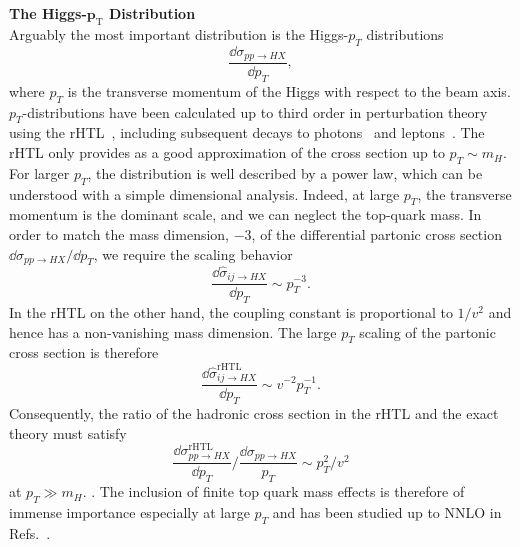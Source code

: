 \textbf{The Higgs-$\mathbf{p}_\mathrm{T}$ Distribution}\\
Arguably the most important distribution is the Higgs-$p_T$ distributions
\begin{equation}
\frac{\dd \sigma_{pp \rightarrow HX}}{\dd  p_T},
\end{equation}
where $p_T$ is the transverse momentum of the Higgs with respect to the beam axis. $p_T$-distributions have been calculated up to third order in perturbation theory using the \acs{rHTL}~\cite{Chen:2014gva,Becker:2020rjp}, including subsequent decays to photons~\cite{Chen:2021isd} and leptons~\cite{Chen:2019zel}. The \acs{rHTL} only provides as a good approximation of the cross section up to $p_T \sim m_H$. For larger $p_T$, the distribution is well described by a power law, which can be understood with a simple dimensional analysis. Indeed, at large $p_T$, the transverse momentum is the dominant scale, and we can neglect the top-quark mass. In order to match the mass dimension, $-3$, of the differential partonic cross section $\dd \sigma_{pp \rightarrow HX}/\dd p_T$, we require the scaling behavior
\begin{equation}
\frac{\dd \hat{\sigma}_{ij \rightarrow HX}}{\dd p_T} \sim  p_T^{-3}.
\end{equation}
In the \acs{rHTL} on the other hand, the coupling constant is proportional to $1/v^2$ and hence has a non-vanishing mass dimension. The large $p_T$ scaling of the partonic cross section is therefore
\begin{equation}
\frac{\dd \hat{\sigma}_{ij \rightarrow HX}^\mathrm{rHTL}}{\dd p_T} \sim v^{-2}p_T^{-1}.
\end{equation}
Consequently, the ratio of the hadronic cross section in the \acs{rHTL} and the exact theory must satisfy
\begin{equation}
\frac{\dd \sigma_{pp \rightarrow HX}^{\mathrm{rHTL}}}{\dd p_T} \bigg / \frac{\dd \sigma_{pp \rightarrow HX}}{ p_T} \sim p_T^2/v^2
\end{equation}
at $p_T \gg m_H$.
. The inclusion of finite top quark mass effects is therefore of immense importance especially at large $p_T$ and has been studied up to \acs{NNLO} in Refs.~\cite{Grazzini:2013mca, Buschmann:2014sia, Jones:2018hbb}.

